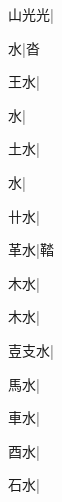 \begin{multicols}{2}
{{\cjk{}山光光}\mktsJzrVerticalBar{}{\cjk{}{\cnsym{}　}{\cnsym{}　}{\cnsym{}　}}|{}\par
{\cjk{}{\cnsym{}　}{\cnsym{}　}水}\mktsJzrVerticalBar{}{\cjk{}{\cnsym{}　}{\cnsym{}　}{\cnsym{}　}}|{\cjk{}沓}\par
{\cjk{}{\cnsym{}　}王水}\mktsJzrVerticalBar{}{\cjk{}{\cnsym{}　}{\cnsym{}　}{\cnsym{}　}}|{}\par
{水}\mktsJzrVerticalBar{}{\cjk{}{\cnsym{}　}{\cnsym{}　}{\cnsym{}　}}|{}\par
{\cjk{}{\cnsym{}　}土水}\mktsJzrVerticalBar{}{\cjk{}{\cnsym{}　}{\cnsym{}　}{\cnsym{}　}}|{}\par
{水}\mktsJzrVerticalBar{}{\cjk{}{\cnsym{}　}{\cnsym{}　}{\cnsym{}　}}|{}\par
{\cjk{}{\cnsym{}　}卄水}\mktsJzrVerticalBar{}{\cjk{}{\cnsym{}　}{\cnsym{}　}{\cnsym{}　}}|{}\par
{\cjk{}{\cnsym{}　}革水}\mktsJzrVerticalBar{}{\cjk{}{\cnsym{}　}{\cnsym{}　}{\cnsym{}　}}|{\cjk{}鞜}\par
{\cjk{}{\cnsym{}　}木水}\mktsJzrVerticalBar{}{\cjk{}{\cnsym{}　}{\cnsym{}　}{\cnsym{}　}}|{}\par
{木水}\mktsJzrVerticalBar{}{\cjk{}{\cnsym{}　}{\cnsym{}　}{\cnsym{}　}}|{}\par
{\cjk{}壴支水}\mktsJzrVerticalBar{}{\cjk{}{\cnsym{}　}{\cnsym{}　}{\cnsym{}　}}|{}\par
{\cjk{}{\cnsym{}　}馬水}\mktsJzrVerticalBar{}{\cjk{}{\cnsym{}　}{\cnsym{}　}{\cnsym{}　}}|{}\par
{\cjk{}{\cnsym{}　}車水}\mktsJzrVerticalBar{}{\cjk{}{\cnsym{}　}{\cnsym{}　}{\cnsym{}　}}|{}\par
{\cjk{}{\cnsym{}　}酉水}\mktsJzrVerticalBar{}{\cjk{}{\cnsym{}　}{\cnsym{}　}{\cnsym{}　}}|{}\par
{\cjk{}{\cnsym{}　}石水}\mktsJzrVerticalBar{}{\cjk{}{\cnsym{}　}{\cnsym{}　}{\cnsym{}　}}|{}\par
}
\end{multicols}
